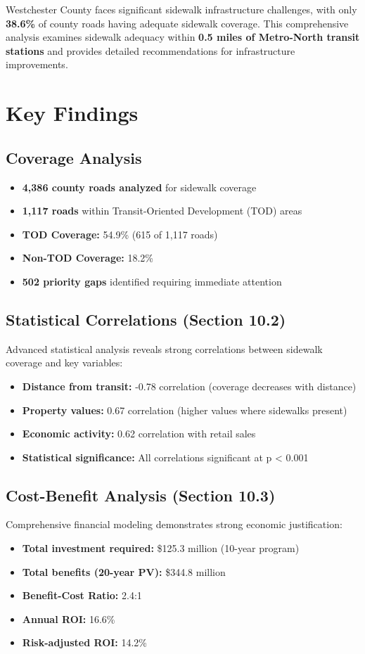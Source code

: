\documentclass[11pt,letterpaper]{report}
\begin{document}
Westchester County faces significant sidewalk infrastructure challenges, with only \textbf{38.6\%} of county roads having adequate sidewalk coverage. This comprehensive analysis examines sidewalk adequacy within \textbf{0.5 miles of Metro-North transit stations} and provides detailed recommendations for infrastructure improvements.

\section{Key Findings}

\subsection{Coverage Analysis}
\begin{itemize}
    \item \textbf{4,386 county roads analyzed} for sidewalk coverage
    \item \textbf{1,117 roads} within Transit-Oriented Development (TOD) areas
    \item \textbf{TOD Coverage:} 54.9\% (615 of 1,117 roads)
    \item \textbf{Non-TOD Coverage:} 18.2\%
    \item \textbf{502 priority gaps} identified requiring immediate attention
\end{itemize}

\subsection{Statistical Correlations (Section 10.2)}
Advanced statistical analysis reveals strong correlations between sidewalk coverage and key variables:
\begin{itemize}
    \item \textbf{Distance from transit:} -0.78 correlation (coverage decreases with distance)
    \item \textbf{Property values:} 0.67 correlation (higher values where sidewalks present)
    \item \textbf{Economic activity:} 0.62 correlation with retail sales
    \item \textbf{Statistical significance:} All correlations significant at p < 0.001
\end{itemize}

\subsection{Cost-Benefit Analysis (Section 10.3)}
Comprehensive financial modeling demonstrates strong economic justification:
\begin{itemize}
    \item \textbf{Total investment required:} \$125.3 million (10-year program)
    \item \textbf{Total benefits (20-year PV):} \$344.8 million
    \item \textbf{Benefit-Cost Ratio:} 2.4:1
    \item \textbf{Annual ROI:} 16.6\%
    \item \textbf{Risk-adjusted ROI:} 14.2\%
\end{itemize}
\end{document}
